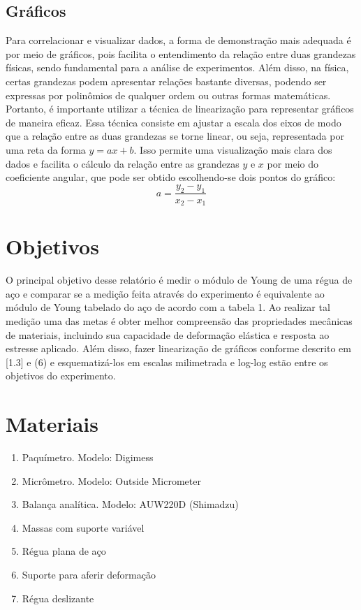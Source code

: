 \documentclass{article}
\begin{document}
\subsection{Gráficos}

Para correlacionar e visualizar dados, a forma de demonstração mais adequada é por meio de gráficos, pois facilita o entendimento da relação entre duas grandezas físicas, sendo fundamental para a análise de experimentos.
Além disso, na física, certas grandezas podem apresentar relações bastante diversas, podendo ser expressas por polinômios de qualquer ordem ou outras formas matemáticas. Portanto, é importante utilizar a técnica de linearização para representar gráficos de maneira eficaz. Essa técnica consiste em ajustar a escala dos eixos de modo que a relação entre as duas grandezas se torne linear, ou seja, representada por uma reta da forma $y=ax+b$. Isso permite uma visualização mais clara dos dados e facilita o cálculo da relação entre as grandezas $y$ e $x$ por meio do coeficiente angular, que pode ser obtido escolhendo-se dois pontos do gráfico:
\begin{equation}
a = \frac{y_2 - y_1}{x_2 - x_1}
\end{equation}

\section{Objetivos}

 O principal objetivo desse relatório é medir o módulo de Young de uma régua de aço e comparar se a medição feita através do experimento é equivalente ao módulo de Young tabelado do aço de acordo com a tabela 1. Ao realizar tal medição uma das metas é obter melhor compreensão das propriedades mecânicas de materiais, incluindo sua capacidade de deformação elástica e resposta ao estresse aplicado. Além disso, fazer linearização de gráficos conforme descrito em [1.3] e (6) e esquematizá-los em escalas milimetrada e log-log estão entre os objetivos do experimento. 

\section{Materiais} 

\begin{enumerate}
    \item Paquímetro. Modelo: Digimess
    \item Micrômetro. Modelo: Outside Micrometer
    \item Balança analítica. Modelo: AUW220D (Shimadzu)
    \item Massas com suporte variável 
    \item Régua plana de aço
    \item Suporte para aferir deformação
    \item Régua deslizante
\end{enumerate}
\end{document}
